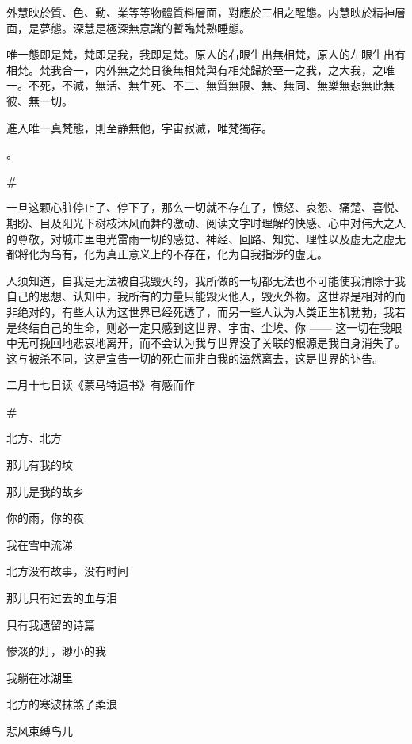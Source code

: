\documentclass{ctexbook}
\begin{document}
    外慧映於質、色、動、業等等物體質料層面，對應於三相之醒態。内慧映於精神層面，是夢態。深慧是極深無意識的暫臨梵熟睡態。
    
    唯一態即是梵，梵即是我，我即是梵。原人的右眼生出無相梵，原人的左眼生出有相梵。梵我合一，内外無{}之梵日後無相梵與有相梵歸於至一之我，之大我，之唯一。不死，不滅，無活、無生死、不二、無質無限、無{}、無同、無樂無悲無此無彼、無一切。
    
    進入唯一真梵態，則至静無他，宇宙寂滅，唯梵獨存。

    {}。

\newpage
\textbf{\#}


\mbox


    一旦这颗心脏停止了、停下了，那么一切就不存在了，愤怒、哀怨、痛楚、喜悦、期盼、目及阳光下树枝沐风而舞的激动、阅读文字时理解的快感、心中对伟大之人的尊敬，对城市里电光雷雨一切的感觉、神经、回路、知觉、理性以及虚无之虚无都将化为乌有，化为真正意义上的不存在，化为自我指涉的虚无。

    人须知道，自我是无法被自我毁灭的，我所做的一切都无法也不可能使我清除于我自己的思想、认知中，我所有的力量只能毁灭他人，毁灭外物。这世界是相对的而非绝对的，有些人认为这世界已经死透了，而另一些人认为人类正生机勃勃，我若是终结自己的生命，则必一定只感到这世界、宇宙、尘埃、你 —— 这一切在我眼中无可挽回地悲哀地离开，而不会认为我与世界没了关联的根源是我自身消失了。这与被杀不同，这是宣告一切的死亡而非自我的溘然离去，这是世界的讣告。


\mbox


    {\hfill 二月十七日读《蒙马特遗书》有感而作}

\newpage
\textbf{\#}


\mbox


    北方、北方
    
    那儿有我的坟
    
    那儿是我的故乡
    
    你的雨，你的夜
    
    我在雪中流涕


\mbox


    北方没有故事，没有时间
    
    那儿只有过去的血与泪
    
    只有我遗留的诗篇
    
    惨淡的灯，渺小的我
    
    我躺在冰湖里


\mbox


    北方的寒波抹煞了柔浪
    
    悲风束缚鸟儿
    
\end{document}
